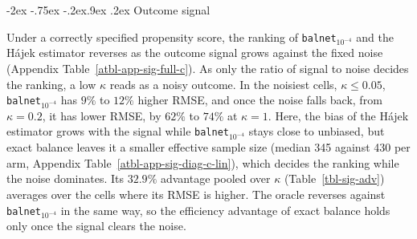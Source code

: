 \documentclass[
  12pt,
  a4paper,
]{article}
\makeatletter
\renewcommand\subsection{\@startsection{subsection}{2}{\z@}%
  {-2ex \@plus -.75ex \@minus -.2ex}{.9ex \@plus .2ex}%
  {\normalfont\large\bfseries}}
\makeatother
\begin{document}
\subsection{Outcome signal}\label{sec-s1-signal}

Under a correctly specified propensity score, the ranking of
\texttt{balnet}\(_{10^{-4}}\) and the Hájek estimator reverses as the
outcome signal grows against the fixed noise
(Appendix Table~\ref{atbl-app-sig-full-c}). As only the ratio of signal
to noise decides the ranking, a low \(\kappa\) reads as a noisy outcome.
In the noisiest cells, \(\kappa \le 0.05\),
\texttt{balnet}\(_{10^{-4}}\) has \(9\%\) to \(12\%\) higher RMSE, and
once the noise falls back, from \(\kappa = 0.2\), it has lower RMSE, by
\(62\%\) to \(74\%\) at \(\kappa = 1\). Here, the bias of the Hájek
estimator grows with the signal while \texttt{balnet}\(_{10^{-4}}\)
stays close to unbiased, but exact balance leaves it a smaller effective
sample size (median 345 against 430 per arm,
Appendix Table~\ref{atbl-app-sig-diag-c-lin}), which decides the ranking
while the noise dominates. Its \(32.9\%\) advantage pooled over
\(\kappa\) (Table~\ref{tbl-sig-adv}) averages over the cells where its
RMSE is higher. The oracle reverses against
\texttt{balnet}\(_{10^{-4}}\) in the same way, so the efficiency
advantage of exact balance holds only once the signal clears the noise.

\begin{table}[!htbp]

\caption{\label{tbl-sig-adv}\(\bar R(\Theta)\) and \(\bar s_m(\Theta)\)
of balnet against glmnet (Hájek), correct specification, \(\kappa\) =
0.02 to 1.}


\end{table}%
\end{document}
